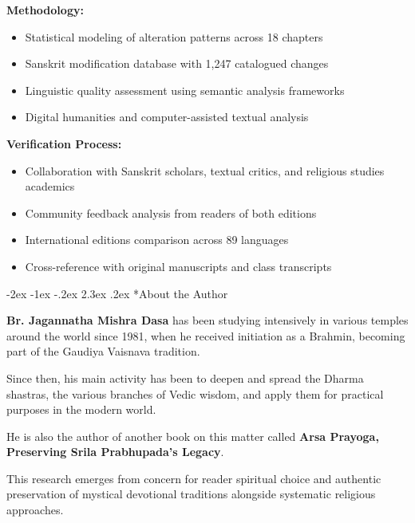 \documentclass[12pt,twoside]{book}
\makeatletter
\renewcommand\section{\@startsection{section}{1}{\z@}%
{-2ex \@plus -1ex \@minus -.2ex}%
{2.3ex \@plus.2ex}%
{\normalfont\Large\bfseries}}
\makeatother
\begin{document}
\textbf{\textbf{Methodology:}}
\begin{itemize}
\item Statistical modeling of alteration patterns across 18 chapters
\item Sanskrit modification database with 1,247 catalogued changes
\item Linguistic quality assessment using semantic analysis frameworks
\item Digital humanities and computer-assisted textual analysis
\end{itemize}

\textbf{\textbf{Verification Process:}}
\begin{itemize}
\item Collaboration with Sanskrit scholars, textual critics, and religious studies academics
\item Community feedback analysis from readers of both editions
\item International editions comparison across 89 languages
\item Cross-reference with original manuscripts and class transcripts
\end{itemize}

\clearpage
\section*{About the Author}
\thispagestyle{sectionopening}

\textbf{\textbf{Br. Jagannatha Mishra Dasa}} has been studying intensively in various temples around the world since 1981, when he received initiation as a Brahmin, becoming part of the Gaudiya Vaisnava tradition.

Since then, his main activity has been to deepen and spread the Dharma shastras, the various branches of Vedic wisdom, and apply them for practical purposes in the modern world.

He is also the author of another book on this matter called \textbf{Arsa Prayoga, Preserving Srila Prabhupada's Legacy}.

This research emerges from concern for reader spiritual choice and authentic preservation of mystical devotional traditions alongside systematic religious approaches.

\newpage
\thispagestyle{empty}
\end{document}
